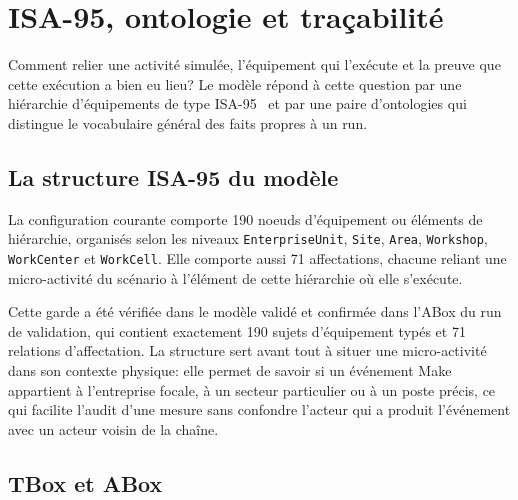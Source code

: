 \chapter{ISA-95, ontologie et traçabilité}
\label{chap:isa95-ontologie}

Comment relier une activité simulée, l'équipement qui l'exécute et la preuve que cette exécution a bien eu lieu? Le modèle répond à cette question par une hiérarchie d'équipements de type ISA-95~\cite{isa2025} et par une paire d'ontologies qui distingue le vocabulaire général des faits propres à un run.

\section{La structure ISA-95 du modèle}

La configuration courante comporte 190 noeuds d'équipement ou éléments de hiérarchie, organisés selon les niveaux \texttt{EnterpriseUnit}, \texttt{Site}, \texttt{Area}, \texttt{Workshop}, \texttt{WorkCenter} et \texttt{WorkCell}. Elle comporte aussi 71 affectations, chacune reliant une micro-activité du scénario à l'élément de cette hiérarchie où elle s'exécute.



Cette garde a été vérifiée dans le modèle validé et confirmée dans l'ABox du run de validation, qui contient exactement 190 sujets d'équipement typés et 71 relations d'affectation. La structure sert avant tout à situer une micro-activité dans son contexte physique: elle permet de savoir si un événement Make appartient à l'entreprise focale, à un secteur particulier ou à un poste précis, ce qui facilite l'audit d'une mesure sans confondre l'acteur qui a produit l'événement avec un acteur voisin de la chaîne.

\section{TBox et ABox}

